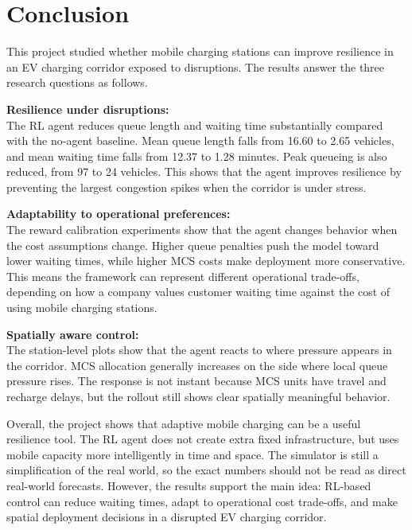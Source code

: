 \documentclass[11pt]{article}
\begin{document}
    \hypertarget{toc-conclusion}{}
    \section{Conclusion}\label{conclusion}

This project studied whether mobile charging stations can improve
resilience in an EV charging corridor exposed to disruptions. The
results answer the three research questions as follows.

\textbf{Resilience under disruptions:}\\
The RL agent reduces queue length and waiting time substantially
compared with the no-agent baseline. Mean queue length falls from 16.60
to 2.65 vehicles, and mean waiting time falls from 12.37 to 1.28
minutes. Peak queueing is also reduced, from 97 to 24 vehicles. This
shows that the agent improves resilience by preventing the largest
congestion spikes when the corridor is under stress.

\textbf{Adaptability to operational preferences:}\\
The reward calibration experiments show that the agent changes behavior
when the cost assumptions change. Higher queue penalties push the model
toward lower waiting times, while higher MCS costs make deployment more
conservative. This means the framework can represent different
operational trade-offs, depending on how a company values customer
waiting time against the cost of using mobile charging stations.

\textbf{Spatially aware control:}\\
The station-level plots show that the agent reacts to where pressure
appears in the corridor. MCS allocation generally increases on the side
where local queue pressure rises. The response is not instant because
MCS units have travel and recharge delays, but the rollout still shows
clear spatially meaningful behavior.

Overall, the project shows that adaptive mobile charging can be a useful
resilience tool. The RL agent does not create extra fixed
infrastructure, but uses mobile capacity more intelligently in time and
space. The simulator is still a simplification of the real world, so the
exact numbers should not be read as direct real-world forecasts.
However, the results support the main idea: RL-based control can reduce
waiting times, adapt to operational cost trade-offs, and make spatial
deployment decisions in a disrupted EV charging corridor.

\end{document}
